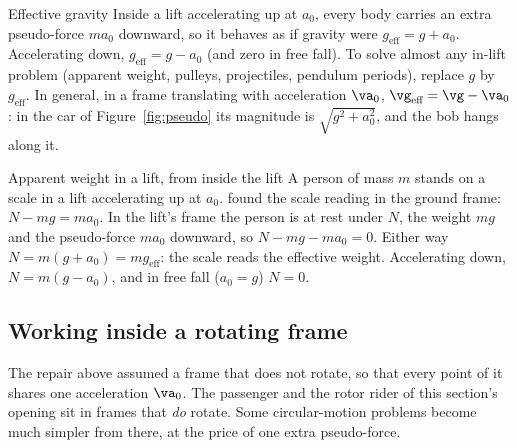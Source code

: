 \begin{keybox}{Effective gravity}
Inside a lift accelerating up at $a_0$, every body carries an extra pseudo-force $ma_0$ downward, so it
behaves as if gravity were $g_{\text{eff}}=g+a_0$. Accelerating down, $g_{\text{eff}}=g-a_0$ (and zero in
free fall). To solve almost any in-lift problem (apparent weight, pulleys, projectiles, pendulum
periods), replace $g$ by $g_{\text{eff}}$. In general, in a frame translating with acceleration $\va_0$,
$\vg_{\text{eff}}=\vg-\va_0$: in the car of Figure~\ref{fig:pseudo} its magnitude is
$\sqrt{g^{2}+a_0^{2}}$, and the bob hangs along it.
\end{keybox}

\begin{exbox}{Apparent weight in a lift, from inside the lift}
A person of mass $m$ stands on a scale in a lift accelerating up at $a_0$.  found the
scale reading in the ground frame: $N-mg=ma_0$. In the lift's frame the person is at rest under $N$, the
weight $mg$ and the pseudo-force $ma_0$ downward, so $N-mg-ma_0=0$. Either way $N=m(g+a_0)=mg_{\text{eff}}$:
the scale reads the effective weight. Accelerating down, $N=m(g-a_0)$, and in free fall ($a_0=g$)
$N=0$. 
\end{exbox}

\subsection{Working inside a rotating frame}\label{sub:rotframe}
The repair above assumed a frame that does not rotate, so that every point of it shares one acceleration
$\va_0$. The passenger and the rotor rider of this section's opening sit in frames that \emph{do} rotate.
Some circular-motion problems become much simpler from there, at the price of one extra pseudo-force.

